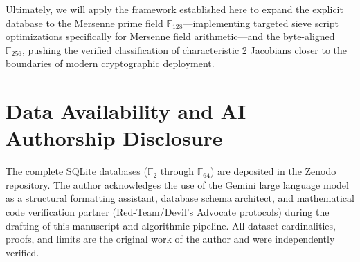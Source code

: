 \documentclass[11pt,letterpaper]{article}
\begin{document}
Ultimately, we will apply the framework established here to expand the explicit database to the Mersenne prime field $\mathbb{F}_{128}$---implementing targeted sieve script optimizations specifically for Mersenne field arithmetic---and the byte-aligned $\mathbb{F}_{256}$, pushing the verified classification of characteristic 2 Jacobians closer to the boundaries of modern cryptographic deployment.

\section{Data Availability and AI Authorship Disclosure}
The complete SQLite databases ($\mathbb{F}_{2}$ through $\mathbb{F}_{64}$) are deposited in the Zenodo repository. The author acknowledges the use of the Gemini large language model \cite{Gemini2026} as a structural formatting assistant, database schema architect, and mathematical code verification partner (Red-Team/Devil's Advocate protocols) during the drafting of this manuscript and algorithmic pipeline. All dataset cardinalities, proofs, and limits are the original work of the author and were independently verified.
\end{document}
